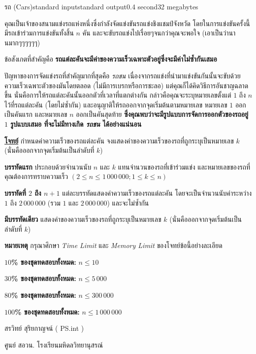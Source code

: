 \documentclass[11pt,a4paper]{article}
\begin{document}
\begin{problem}{รถ (Cars)}{standard input}{standard output}{0.4 second}{32 megabytes}

     คุณเป็นเจ้าของสนามแข่งรถแห่งหนึ่งซึ่งกำลังจัดแข่งขันรถแข่งชิงแชมป์จังหวัด โดยในการแข่งขันครั้งนี้มีรถเข้าร่วมการแข่งขันทั้งสิ้น $n$ คัน และจะขับรถแข่งไปเรื่อยๆจนกว่าคุณจะพอใจ (เอาเป็นว่านานมากๆๆๆๆๆๆ)

            ข้อสังเกตที่สำคัญคือ \textbf{รถแต่ละคันจะมีค่าของความเร็วเฉพาะตัวอยู่ซึ่งจะมีค่าไม่ซ้ำกันเสมอ}

            ปัญหาของการจัดแข่งรถที่สำคัญมากที่สุดคือ \textit{รถชน} เนื่องจากรถแข่งที่นำมาแข่งขันกันนั้นจะขับด้วยความเร็วเฉพาะตัวของมันโดยตลอด (ไม่มีการเบรกหรือการชะลอ) แต่คุณก็ได้คิดวิธีการอันชาญฉลาดขึ้น นั่นคือการให้รถแต่ละคันนั้นออกตัวที่เวลาที่แตกต่างกัน กล่าวคือคุณจะระบุหมายเลขตั้งแต่ $1$ ถึง $n$ ไว้ที่รถแต่ละคัน (โดยไม่ซ้ำกัน) และอนุญาติให้รถออกจากจุดเริ่มต้นตามหมายเลข หมายเลข $1$ ออกเป็นคันแรก และหมายเลข $n$ ออกเป็นคันสุดท้าย\textbf{ ซึ่งคุณพบว่าจะมีรูปแบบการจัดการออกตัวของรถอยู่ $1$ รูปแบบเสมอ ที่จะไม่มีทางเกิด \textit{รถชน} ได้อย่างแน่นอน}

\bigskip
\underline{\textbf{โจทย์}}  กำหนดค่าความเร็วของรถแต่ละคัน จงแสดงค่าของความเร็วของรถที่ถูกระบุเป็นหมายเลข $k$ (นั่นคือออกจากจุดเริ่มต้นเป็นลำดับที่ $k$)


\InputFile

\textbf{บรรทัดแรก} ประกอบด้วยจำนวนนับ $n$ และ $k$ แทนจำนวนของรถที่เข้าร่วมแข่ง และหมายเลขของรถที่คุณต้องการทราบความเร็ว $(2 \leq n \leq  1\,000\,000 ; 1 \leq k \leq n )$

\textbf{บรรทัดที่ $2$ ถึง $n+1$} แต่ละบรรทัดแสดงค่าความเร็วของรถแต่ละคัน โดยจะเป็นจำนวนนับค่าระหว่าง $1$ ถึง $2\,000\,000$ (รวม $1$ และ $2\,000\,000$) และจะไม่ซ้ำกัน


\OutputFile

\textbf{มีบรรทัดเดียว} แสดงค่าของความเร็วของรถที่ถูกระบุเป็นหมายเลข $k$ (นั่นคือออกจากจุดเริ่มต้นเป็นลำดับที่ $k$)

\textbf{หมายเหตุ} กรุณาศึกษา \textit{Time Limit} และ \textit{Memory Limit} ของโจทย์ข้อนี้อย่างละเอียด

\Examples

\begin{example}
%
%
\end{example}

\Scoring

\textbf{$10$\% ของชุดทดสอบทั้งหมด:} $n \leq 10$

\textbf{$30$\% ของชุดทดสอบทั้งหมด: }$n \leq 5\,000$

\textbf{$80$\% ของชุดทดสอบทั้งหมด:} $n \leq 300\,000$

\textbf{$100$\% ของชุดทดสอบทั้งหมด:} $n \leq 1\,000\,000$

\Source

สรวิทย์  สุริยกาญจน์ ( PS.int )

ศูนย์ สอวน. โรงเรียนมหิดลวิทยานุสรณ์

\end{problem}
\end{document}
